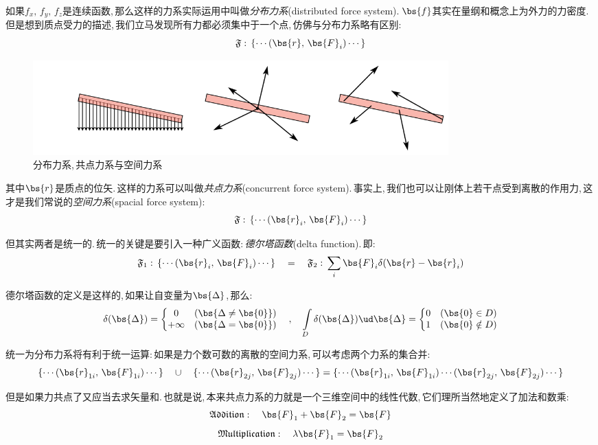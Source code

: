 如果$f_x,\,f_y,\,f_z$是连续函数,\,那么这样的力系实际运用中叫做\emph{分布力系}(distributed force system).\,$\bs{f}$其实在量纲和概念上为外力的力密度.\,但是想到质点受力的描述,\,我们立马发现所有力都必须集中于一个点,\,仿佛与分布力系略有区别:
\[\mathfrak{F}:\,\{\cdots(\bs{r},\,\bs{F}_i)\cdots\}\]

\begin{figure}[H]
\centering
\includegraphics[width=16cm]{image/6-2-8.png}
\caption{分布力系,\,共点力系与空间力系}
\end{figure}

其中$\bs{r}$是质点的位矢.\,这样的力系可以叫做\emph{共点力系}(concurrent force system).\,事实上,\,我们也可以让刚体上若干点受到离散的作用力,\,这才是我们常说的\emph{空间力系}(spacial force system):
\[\mathfrak{F}:\,\{\cdots(\bs{r}_i,\,\bs{F}_i)\cdots\}\]

但其实两者是统一的.\,统一的关键是要引入一种广义函数:\,\emph{德尔塔函数}(delta function).\,即:
\[\mathfrak{F}_1:\,\{\cdots(\bs{r}_i,\,\bs{F}_i)\cdots\}\quad =\quad \mathfrak{F}_2:\,\sum_i \bs{F}_i\delta(\bs{r}-\bs{r}_i)\]

德尔塔函数的定义是这样的,\,如果让自变量为$\bs{\Delta}$,\,那么:
\[\delta(\bs{\Delta})=\left\{\begin{matrix}0& (\bs{\Delta\neq \bs{0}}) \\ +\infty&(\bs{\Delta= \bs{0}})\end{matrix}\right.\quad,\quad \int\limits_D \delta(\bs{\Delta})\ud \bs{\Delta}=\left\{\begin{matrix}0& (\bs{0}\in D) \\ 1&(\bs{0}\notin D)\end{matrix}\right.\]

统一为分布力系将有利于统一运算:\,如果是力个数可数的离散的空间力系,\,可以考虑两个力系的集合并:
\[\{\cdots(\bs{r}_{1i},\,\bs{F}_{1i})\cdots\}\quad \cup\quad\{\cdots(\bs{r}_{2j},\,\bs{F}_{2j})\cdots\}=\{\cdots(\bs{r}_{1i},\,\bs{F}_{1i})\cdots(\bs{r}_{2j},\,\bs{F}_{2j})\cdots\}\]

但是如果力共点了又应当去求矢量和.\,也就是说,\,本来共点力系的力就是一个三维空间中的线性代数,\,它们理所当然地定义了加法和数乘:
\[\mathfrak{Addition}:\quad \bs{F}_1+\bs{F}_2=\bs{F}\]
\[\mathfrak{Multiplication}:\quad \lambda \bs{F}_1=\bs{F}_2\]

